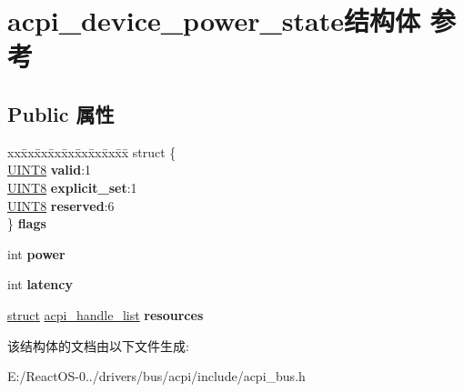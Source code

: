 \hypertarget{structacpi__device__power__state}{}\section{acpi\+\_\+device\+\_\+power\+\_\+state结构体 参考}
\label{structacpi__device__power__state}
\subsection*{Public 属性}
\begin{DoxyCompactItemize}
\item 
\mbox{\label{structacpi__device__power__state_a5fade88a8f917aa643eca3a16a608241}} 
\begin{tabbing}
xx\=xx\=xx\=xx\=xx\=xx\=xx\=xx\=xx\=\kill
struct \{\\
\>\hyperlink{_processor_bind_8h_ab27e9918b538ce9d8ca692479b375b6a}{UINT8} {\bfseries valid}:1\\
\>\hyperlink{_processor_bind_8h_ab27e9918b538ce9d8ca692479b375b6a}{UINT8} {\bfseries explicit\_set}:1\\
\>\hyperlink{_processor_bind_8h_ab27e9918b538ce9d8ca692479b375b6a}{UINT8} {\bfseries reserved}:6\\
\} {\bfseries flags}\\

\end{tabbing}\item 
\mbox{\label{structacpi__device__power__state_a293c3c6741acfb7ab3bcdbcc7b2ed986}} 
int {\bfseries power}
\item 
\mbox{\label{structacpi__device__power__state_a9c10601b883da4ef75a32a34c897d082}} 
int {\bfseries latency}
\item 
\mbox{\label{structacpi__device__power__state_a0109f36f6f5720cdf172116f2b30e8fa}} 
\hyperlink{interfacestruct}{struct} \hyperlink{structacpi__handle__list}{acpi\+\_\+handle\+\_\+list} {\bfseries resources}
\end{DoxyCompactItemize}


该结构体的文档由以下文件生成\+:\begin{DoxyCompactItemize}
\item 
E\+:/\+React\+O\+S-\/0../drivers/bus/acpi/include/acpi\+\_\+bus.\+h\end{DoxyCompactItemize}
